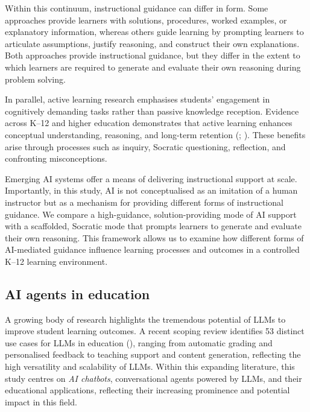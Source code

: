 \documentclass[
  12pt,
]{article}
\begin{document}
Within this continuum, instructional guidance can differ in form. Some approaches provide learners with solutions, procedures, worked examples, or explanatory information, whereas others guide learning by prompting learners to articulate assumptions, justify reasoning, and construct their own explanations. Both approaches provide instructional guidance, but they differ in the extent to which learners are required to generate and evaluate their own reasoning during problem solving.

In parallel, active learning research emphasises students' engagement in cognitively demanding tasks rather than passive knowledge reception. Evidence across K--12 and higher education demonstrates that active learning enhances conceptual understanding, reasoning, and long-term retention (; ). These benefits arise through processes such as inquiry, Socratic questioning, reflection, and confronting misconceptions.

Emerging AI systems offer a means of delivering instructional support at scale. Importantly, in this study, AI is not conceptualised as an imitation of a human instructor but as a mechanism for providing different forms of instructional guidance. We compare a high-guidance, solution-providing mode of AI support with a scaffolded, Socratic mode that prompts learners to generate and evaluate their own reasoning. This framework allows us to examine how different forms of AI-mediated guidance influence learning processes and outcomes in a controlled K--12 learning environment.

\subsection{AI agents in education}\label{ai-agents-in-education}

A growing body of research highlights the tremendous potential of LLMs to improve student learning outcomes. A recent scoping review identifies 53 distinct use cases for LLMs in education (), ranging from automatic grading and personalised feedback to teaching support and content generation, reflecting the high versatility and scalability of LLMs. Within this expanding literature, this study centres on \emph{AI chatbots}, conversational agents powered by LLMs, and their educational applications, reflecting their increasing prominence and potential impact in this field.
\end{document}
